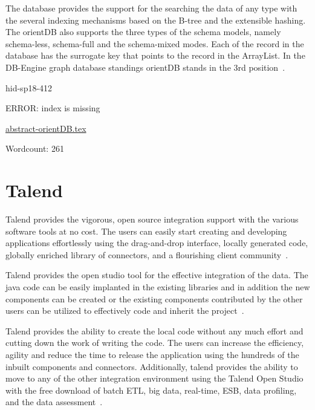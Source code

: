 The database provides the support for the searching
the data of any type with the several indexing mechanisms based on the
B-tree and the extensible hashing. The orientDB also supports the three 
types of the schema models, namely schema-less, schema-full and the 
schema-mixed modes. Each of the record in the database has the 
surrogate key that points to the record in the ArrayList. In the DB-Engine 
graph database standings orientDB stands 
in the 3rd position~\cite{hid-sp18-412-orientDB_wiki}.








\begin{IU}

hid-sp18-412

ERROR: index is missing

\href{https://github.com/cloudmesh-community/hid-sp18-412/blob/master//technology/abstract-orientDB.tex}{abstract-orientDB.tex}

 

Wordcount: 261

\end{IU}

\section{Talend}
Talend provides the vigorous, open source integration support with the various
software tools at no cost. The users can easily start creating and developing
applications effortlessly using the drag-and-drop interface, locally generated
code, globally enriched library of connectors, and a flourishing client
community~\cite{hid-sp18-412-talend_products}.

Talend provides the open studio tool for the effective integration of the data.
 The java code can be easily implanted in the existing libraries and in
addition the new components can be created or the existing components
contributed by the other users can be utilized to effectively code and
inherit the project~\cite{hid-sp18-412-talend_open_studio}.

Talend provides the ability to create the local code without any much effort
and cutting down the work of writing the code.
The users can increase the efficiency, agility and
reduce the time to release the application using the hundreds of the
inbuilt components and connectors. Additionally, talend provides the
ability to move to any of the other integration environment using the
Talend Open Studio with the free download of batch ETL, big data, real-time,
ESB, data profiling, and
the data assessment~\cite{hid-sp18-412-talend_products}.

